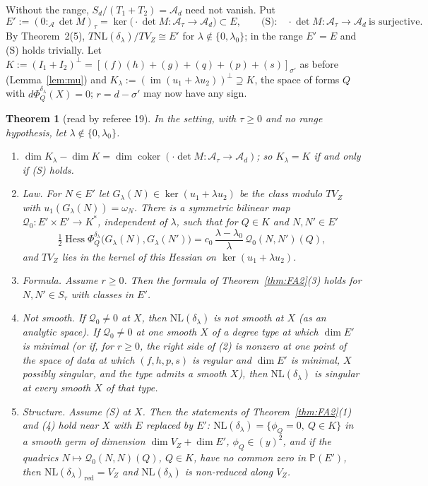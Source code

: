 \documentclass[11pt]{article}
\numberwithin{equation}{section}
\newtheorem{theorem}{Theorem}[section]
\theoremstyle{remark}
\newcommand{\PP}{\mathbb{P}}
\newcommand{\NL}{\mathrm{NL}}
\newcommand{\VZ}{V_Z}
\newcommand{\cA}{\mathcal{A}}
\newcommand{\Hess}{\operatorname{Hess}}
\newcommand{\lz}{\lambda_0}
\begin{document}
Without the range, $S_d/(T_1+T_2)=\cA_d$ need not vanish. Put
\[
E':=(0:_\cA\det M)_\tau=\ker\bigl(\cdot\det M\colon\cA_\tau\to\cA_d\bigr)\subset E,\qquad
\text{(S):}\quad \cdot\det M\colon\cA_\tau\to\cA_d\ \text{is surjective}.
\]
By Theorem~2(5), $T\NL(\delta_\lambda)/T\VZ\cong E'$ for $\lambda\notin\{0,\lz\}$; in the range $E'=E$ and (S) holds
trivially. Let $K:=(I_1+I_2)^\perp=[(f)(h)+(g)+(q)+(p)+(s)]_{\sigma'}$ as before (Lemma~\ref{lem:mu}) and
$K_\lambda:=(\operatorname{im}(u_1+\lambda u_2))^\perp\supseteq K$, the space of forms $Q$ with
$d\Phi^{\delta_\lambda}_Q(X)=0$; $r=d-\sigma'$ may now have any sign.

\begin{theorem}[read by referee 19]\label{thm:FA3}
In the setting, with $\tau\ge0$ and no range hypothesis, let $\lambda\notin\{0,\lz\}$.
\begin{enumerate}
\item[\textup{(0)}] $\dim K_\lambda-\dim K=\dim\operatorname{coker}(\cdot\det M\colon\cA_\tau\to\cA_d)$; so
$K_\lambda=K$ if and only if \textup{(S)} holds.
\item \emph{Law.} For $N\in E'$ let $G_\lambda(N)\in\ker(u_1+\lambda u_2)$ be the class modulo $T\VZ$ with
$u_1(G_\lambda(N))=\omega_N$. There is a symmetric bilinear map $\mathcal Q_0\colon E'\times E'\to K^*$,
independent of $\lambda$, such that for $Q\in K$ and $N,N'\in E'$
\[
\tfrac12\Hess\Phi^{\delta_\lambda}_Q\bigl(G_\lambda(N),G_\lambda(N')\bigr)=c_0\,\frac{\lambda-\lz}{\lambda}\,\mathcal Q_0(N,N')(Q),
\]
and $T\VZ$ lies in the kernel of this Hessian on $\ker(u_1+\lambda u_2)$.
\item \emph{Formula.} Assume $r\ge0$. Then the formula of Theorem~\ref{thm:FA2}(3) holds for
$N,N'\in S_\tau$ with classes in $E'$.
\item \emph{Not smooth.} If $\mathcal Q_0\ne0$ at $X$, then $\NL(\delta_\lambda)$ is not smooth at $X$ (as an
analytic space). If $\mathcal Q_0\ne0$ at one smooth $X$ of a degree type at which $\dim E'$ is minimal (or if,
for $r\ge0$, the right side of (2) is nonzero at one point of the space of data at which
$(f,h,p,s)$ is regular and $\dim E'$ is minimal, $X$ possibly singular, and the type admits a smooth $X$), then
$\NL(\delta_\lambda)$ is singular at every smooth $X$ of that type.
\item \emph{Structure.} Assume \textup{(S)} at $X$. Then the statements of Theorem~\ref{thm:FA2}(1) and (4) hold
near $X$ with $E$ replaced by $E'$: $\NL(\delta_\lambda)=\{\phi_Q=0,\ Q\in K\}$ in a smooth germ of dimension
$\dim\VZ+\dim E'$, $\phi_Q\in(y)^2$, and if the quadrics $N\mapsto\mathcal Q_0(N,N)(Q)$, $Q\in K$, have no common
zero in $\PP(E')$, then $\NL(\delta_\lambda)_{\mathrm{red}}=\VZ$ and $\NL(\delta_\lambda)$ is non-reduced along $\VZ$.
\end{enumerate}
\end{theorem}
\end{document}
